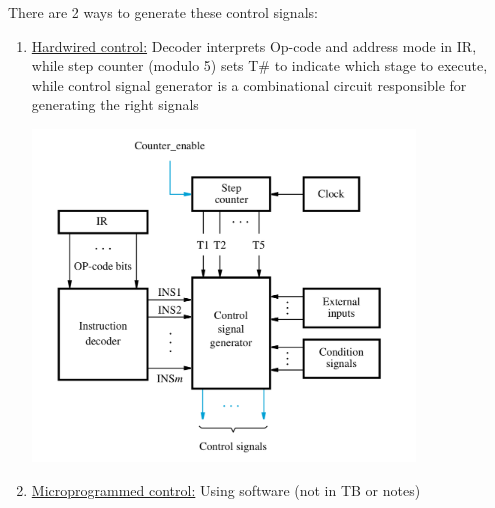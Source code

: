 \documentclass[10pt]{article}
\begin{document}
There are 2 ways to generate these control signals:
\begin{enumerate}
    \item
    \begin{minipage}{0.60\textwidth}
         \underline{Hardwired control:} Decoder interprets Op-code and address mode in IR, while step counter (modulo 5) sets  T\# to indicate which stage to execute, while control signal generator is a combinational circuit responsible for generating the right signals
        \end{minipage} \hfill
        \begin{minipage}{0.35\textwidth}
        \includegraphics[width=0.8\textwidth]{bpu/hardwired.png}
        \end{minipage}
    \item \underline{Microprogrammed control:} Using software (not in TB or notes)
\end{enumerate}
\end{document}
